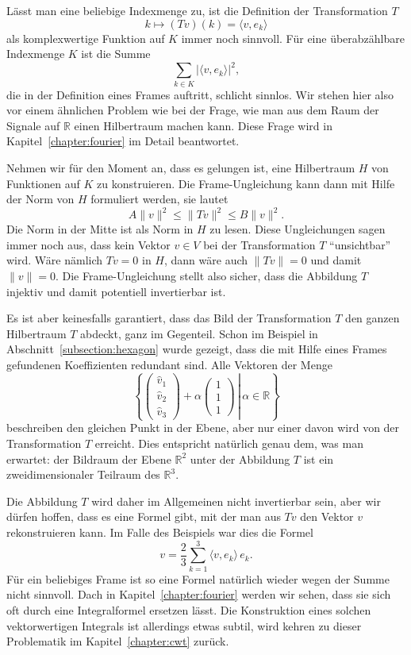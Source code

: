 Lässt man eine beliebige Indexmenge zu, ist die Definition der
Transformation $T$
\[
k
\mapsto
(Tv)(k) = \langle v,e_k\rangle
\]
als komplexwertige Funktion auf $K$ immer noch sinnvoll.
Für eine überabzählbare Indexmenge $K$ ist die Summe 
\[
\sum_{k\in K} |\langle v,e_k\rangle|^2,
\]
die in der Definition eines Frames auftritt, schlicht sinnlos.
Wir stehen hier also vor einem ähnlichen Problem wie bei der Frage,
wie man aus dem Raum der Signale auf $\mathbb R$ einen Hilbertraum machen kann.
Diese Frage wird in Kapitel~\ref{chapter:fourier} im Detail beantwortet.

Nehmen wir für den Moment an, dass es gelungen ist, eine Hilbertraum $H$
von Funktionen auf $K$ zu konstruieren.
Die Frame-Ungleichung kann dann mit Hilfe der Norm von $H$ formuliert
werden, sie lautet
\[
A\|v\|^2 \le \|Tv\|^2 \le B\|v\|^2.
\]
Die Norm in der Mitte ist als Norm in $H$ zu lesen.
Diese Ungleichungen sagen immer noch aus, dass kein Vektor $v\in V$ bei
der Transformation $T$ ``unsichtbar'' wird.
Wäre nämlich $Tv=0$ in $H$, dann wäre auch $\|Tv\|=0$ und damit
$\|v\|=0$.
Die Frame-Ungleichung stellt also sicher, dass die Abbildung $T$ 
injektiv und damit potentiell invertierbar ist.

Es ist aber keinesfalls garantiert, dass das Bild der Transformation $T$
den ganzen Hilbertraum $T$ abdeckt, ganz im Gegenteil.
Schon im Beispiel in Abschnitt~\ref{subsection:hexagon} wurde gezeigt,
dass die mit Hilfe eines Frames gefundenen Koeffizienten redundant sind.
Alle Vektoren der Menge
\[
\left\{
\left.
\begin{pmatrix}\hat{v}_1\\\hat{v}_2\\\hat{v}_3\end{pmatrix}
+\alpha\begin{pmatrix}1\\1\\1\end{pmatrix}
\,
\right|\,
\alpha \in\mathbb R
\right\}
\]
beschreiben den gleichen Punkt in der Ebene, aber nur einer davon 
wird von der Transformation $T$ erreicht.
Dies entspricht natürlich genau dem, was man erwartet: der Bildraum
der Ebene $\mathbb R^2$ unter der Abbildung $T$ ist ein zweidimensionaler
Teilraum des $\mathbb R^3$.

Die Abbildung $T$ wird daher im Allgemeinen nicht invertierbar sein, aber
wir dürfen hoffen, dass es eine Formel gibt, mit der man aus $Tv$ den 
Vektor $v$ rekonstruieren kann.
Im Falle des Beispiels war dies die Formel
\[
v = \frac23 \sum_{k=1}^3 \langle v,e_k\rangle \, e_k.
\]
Für ein beliebiges Frame ist so eine Formel natürlich wieder wegen
der Summe nicht sinnvoll.
Dach in Kapitel~\ref{chapter:fourier} werden wir sehen, dass sie sich
oft durch eine Integralformel ersetzen lässt.
Die Konstruktion eines solchen vektorwertigen Integrals ist allerdings
etwas subtil, wird kehren zu dieser Problematik im Kapitel~\ref{chapter:cwt}
zurück.


